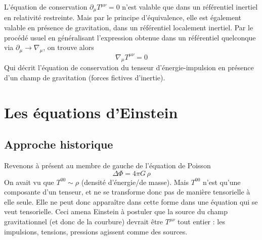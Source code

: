 L'équation de conservation $\partial_{\mu}T^{\mu \nu} = 0$ n'est valable que dans un référentiel inertiel en relativité restreinte. Mais par le principe d'équivalence, elle est également valable en présence de gravitation, dans un référentiel localement inertiel. Par le procédé usuel en généralisant l'expression obtenue dans un référentiel quelconque via $\partial_{\mu} \to \nabla_{\mu}$, on trouve alors
\begin{equation}
    \nabla_{\mu}T^{\mu \nu} = 0
\end{equation}
Qui décrit l'équation de conservation du tenseur d'énergie-impulsion en présence d'un champ de gravitation (forces fictives d'inertie).
\section{Les équations d'Einstein}
\subsection{Approche historique}
Revenons à présent au membre de gauche de l'équation de Poisson
\begin{equation}
    \Delta\Phi = 4\pi G\,\rho
\end{equation}
On avait vu que $T^{00} \sim \rho$ (densité d'énergie/de masse). Mais $T^{00}$ n'est qu'une composante d'un tenseur, et ne se transforme donc pas de manière tensorielle à elle seule. Elle ne peut donc apparaître dans cette forme dans une équation qui se veut tensorielle. Ceci amena Einstein à postuler que la source du champ gravitationnel (et donc de la courbure) devrait être $T^{\mu \nu}$ tout entier : les impulsions, tensions, pressions agissent comme des sources.

